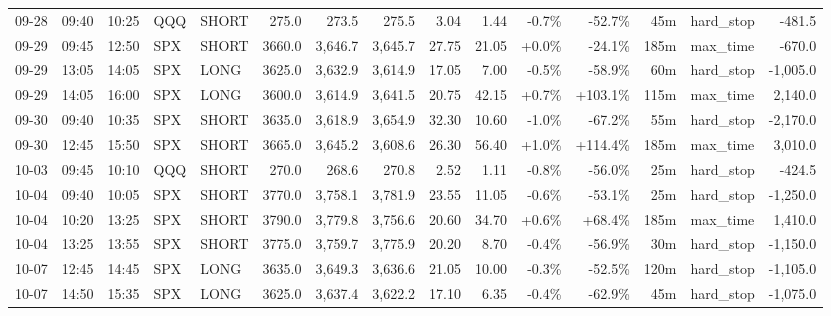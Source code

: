 \documentclass[11pt,a4paper,twoside]{article}
\begin{document}
\begin{landscape}
\begin{center}
\begin{longtable}{>{\color{txtmain}}l l l l l r r r r r r r r >{\color{txtmain}}l r}
09-28 & 09:40 & 10:25 & QQQ & SHORT & 275.0 & 273.5 & 275.5 & 3.04 & 1.44 & \textcolor{lossred}{-0.7\%} & \textcolor{lossred}{-52.7\%} & 45m & hard\_stop & \textcolor{lossred}{-481.5} \\
09-29 & 09:45 & 12:50 & SPX & SHORT & 3660.0 & 3,646.7 & 3,645.7 & 27.75 & 21.05 & \textcolor{wingreen}{+0.0\%} & \textcolor{lossred}{-24.1\%} & 185m & max\_time & \textcolor{lossred}{-670.0} \\
09-29 & 13:05 & 14:05 & SPX & LONG & 3625.0 & 3,632.9 & 3,614.9 & 17.05 & 7.00 & \textcolor{lossred}{-0.5\%} & \textcolor{lossred}{-58.9\%} & 60m & hard\_stop & \textcolor{lossred}{-1,005.0} \\
09-29 & 14:05 & 16:00 & SPX & LONG & 3600.0 & 3,614.9 & 3,641.5 & 20.75 & 42.15 & \textcolor{wingreen}{+0.7\%} & \textcolor{wingreen}{+103.1\%} & 115m & max\_time & \textcolor{wingreen}{2,140.0} \\
09-30 & 09:40 & 10:35 & SPX & SHORT & 3635.0 & 3,618.9 & 3,654.9 & 32.30 & 10.60 & \textcolor{lossred}{-1.0\%} & \textcolor{lossred}{-67.2\%} & 55m & hard\_stop & \textcolor{lossred}{-2,170.0} \\
09-30 & 12:45 & 15:50 & SPX & SHORT & 3665.0 & 3,645.2 & 3,608.6 & 26.30 & 56.40 & \textcolor{wingreen}{+1.0\%} & \textcolor{wingreen}{+114.4\%} & 185m & max\_time & \textcolor{wingreen}{3,010.0} \\
10-03 & 09:45 & 10:10 & QQQ & SHORT & 270.0 & 268.6 & 270.8 & 2.52 & 1.11 & \textcolor{lossred}{-0.8\%} & \textcolor{lossred}{-56.0\%} & 25m & hard\_stop & \textcolor{lossred}{-424.5} \\
10-04 & 09:40 & 10:05 & SPX & SHORT & 3770.0 & 3,758.1 & 3,781.9 & 23.55 & 11.05 & \textcolor{lossred}{-0.6\%} & \textcolor{lossred}{-53.1\%} & 25m & hard\_stop & \textcolor{lossred}{-1,250.0} \\
10-04 & 10:20 & 13:25 & SPX & SHORT & 3790.0 & 3,779.8 & 3,756.6 & 20.60 & 34.70 & \textcolor{wingreen}{+0.6\%} & \textcolor{wingreen}{+68.4\%} & 185m & max\_time & \textcolor{wingreen}{1,410.0} \\
10-04 & 13:25 & 13:55 & SPX & SHORT & 3775.0 & 3,759.7 & 3,775.9 & 20.20 & 8.70 & \textcolor{lossred}{-0.4\%} & \textcolor{lossred}{-56.9\%} & 30m & hard\_stop & \textcolor{lossred}{-1,150.0} \\
10-07 & 12:45 & 14:45 & SPX & LONG & 3635.0 & 3,649.3 & 3,636.6 & 21.05 & 10.00 & \textcolor{lossred}{-0.3\%} & \textcolor{lossred}{-52.5\%} & 120m & hard\_stop & \textcolor{lossred}{-1,105.0} \\
10-07 & 14:50 & 15:35 & SPX & LONG & 3625.0 & 3,637.4 & 3,622.2 & 17.10 & 6.35 & \textcolor{lossred}{-0.4\%} & \textcolor{lossred}{-62.9\%} & 45m & hard\_stop & \textcolor{lossred}{-1,075.0} \\

\end{longtable}
\end{center}
\end{landscape}
\end{document}
